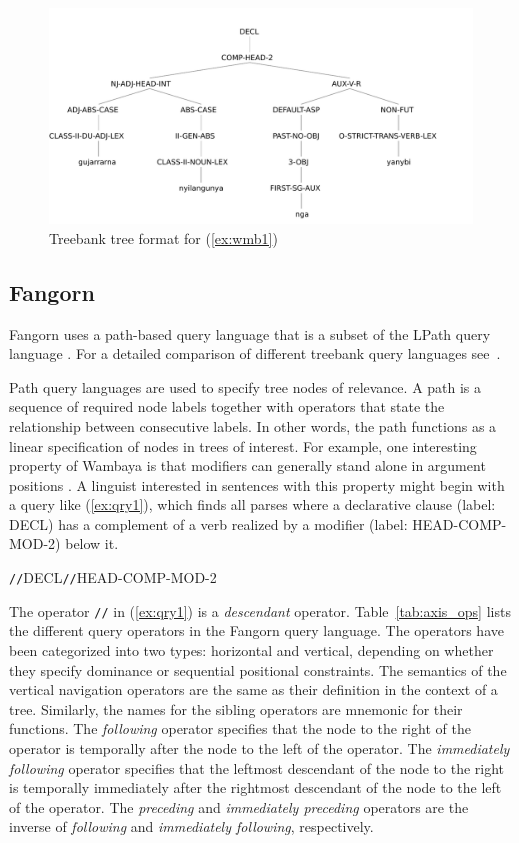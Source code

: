 \documentclass[12pt]{article}
\begin{document}
\begin{figure}
\centering
\includegraphics[width=5in]{sentencetreebank}
\caption{Treebank tree format for (\ref{ex:wmb1})}
\label{fig:sent_tb}
\end{figure}

\subsection{Fangorn}
\label{sec:tss}

Fangorn uses a path-based query language that is
a subset of the LPath query language \cite{Bir:Che:Sus:Lee:Zhe:06}.  For
a detailed comparison of different treebank query languages
see~. 

Path query languages are used to specify tree nodes of relevance.  A
path is a sequence of required node labels together with operators
that state the relationship between consecutive labels.  In other
words, the path functions as a linear specification of nodes in trees
of interest. For example, one interesting property of Wambaya is that
modifiers can generally stand alone in argument positions
\cite{Nordlinger:98a}.  A linguist interested in 
sentences with this property might begin with a query like
(\ref{ex:qry1}), which finds all parses where a declarative clause
(label: {\small DECL}) has a complement of a verb realized by a modifier
(label: {\small HEAD-COMP-MOD-2}) below it.

\begin{exe}
\ex\label{ex:qry1}\small
\verb=//=DECL\verb=//=HEAD-COMP-MOD-2
\end{exe}

The operator \verb=//= in (\ref{ex:qry1}) is a \emph{descendant} operator. Table~\ref{tab:axis_ops} 
lists the different query operators in the Fangorn query language.
The operators have been categorized
into two types: horizontal and vertical, depending on whether they
specify dominance or sequential positional constraints. The semantics
of the vertical navigation operators are the same as their definition
in the context of a tree. Similarly, the names for the sibling operators 
are mnemonic for their functions. The
\emph{following} operator specifies that the node to the right of the
operator is temporally after the node to the left of the operator. The
\emph{immediately following} operator specifies that the leftmost descendant of
the node to the right is temporally immediately after the rightmost
descendant of the node to the left of the operator. The \emph{preceding} and
\emph{immediately preceding} operators are the inverse of \emph{following} and \emph{immediately
following}, respectively.
\end{document}
